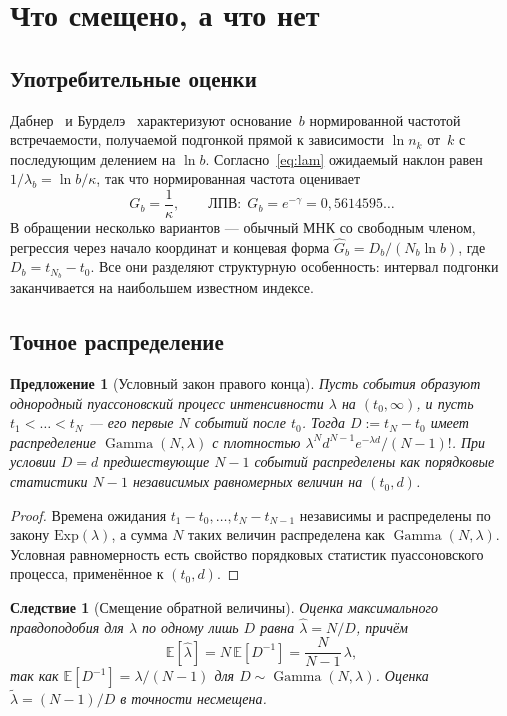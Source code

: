 \documentclass[11pt,a4paper]{article}
\theoremstyle{plain}
\newtheorem{proposition}{Предложение}
\newtheorem{corollary}{Следствие}
\theoremstyle{remark}
\newcommand{\emg}{e^{-\gamma}}
\DeclareMathOperator{\Gam}{Gamma}
\begin{document}
\section{Что смещено, а что нет}\label{sec:notbias}

\subsection{Употребительные оценки}
Дабнер~\cite{dubner1993} и Бурделэ~\cite{bourdelais2009} характеризуют основание~$b$
нормированной частотой встречаемости, получаемой подгонкой прямой к зависимости
$\ln n_k$ от~$k$ с последующим делением на $\ln b$. Согласно~\eqref{eq:lam} ожидаемый
наклон равен $1/\lambda_b=\ln b/\kappa$, так что нормированная частота оценивает
\begin{equation}\label{eq:G}
G_b=\frac{1}{\kappa},\qquad\text{ЛПВ:}\ \ G_b=\emg=0{,}5614595\ldots
\end{equation}
В обращении несколько вариантов --- обычный МНК со свободным членом, регрессия через
начало координат и концевая форма $\hat G_b=D_b/(N_b\ln b)$, где $D_b=t_{N_b}-t_0$.
Все они разделяют структурную особенность: интервал подгонки заканчивается на наибольшем
известном индексе.

\subsection{Точное распределение}

\begin{proposition}[Условный закон правого конца]\label{prop:gamma}
Пусть события образуют однородный пуассоновский процесс интенсивности $\lambda$ на
$(t_0,\infty)$, и пусть $t_1<\dots<t_N$ --- его первые $N$ событий после $t_0$.
Тогда $D:=t_N-t_0$ имеет распределение $\Gam(N,\lambda)$ с плотностью
$\lambda^{N}d^{N-1}e^{-\lambda d}/(N-1)!$. При условии $D=d$ предшествующие $N-1$ событий
распределены как порядковые статистики $N-1$ независимых равномерных величин на $(t_0,d)$.
\end{proposition}

\begin{proof}
Времена ожидания $t_1-t_0,\dots,t_N-t_{N-1}$ независимы и распределены по закону
$\mathrm{Exp}(\lambda)$, а сумма $N$ таких величин распределена как $\Gam(N,\lambda)$.
Условная равномерность есть свойство порядковых статистик пуассоновского процесса,
применённое к $(t_0,d)$.
\end{proof}

\begin{corollary}[Смещение обратной величины]\label{cor:kappa}
Оценка максимального правдоподобия для $\lambda$ по одному лишь $D$ равна
$\hat\lambda=N/D$, причём
\begin{equation}\label{eq:bias}
\mathbb E[\hat\lambda]=N\,\mathbb E[D^{-1}]=\frac{N}{N-1}\,\lambda,
\end{equation}
так как $\mathbb E[D^{-1}]=\lambda/(N-1)$ для $D\sim\Gam(N,\lambda)$. Оценка
$\tilde\lambda=(N-1)/D$ в точности несмещена.
\end{corollary}
\end{document}
